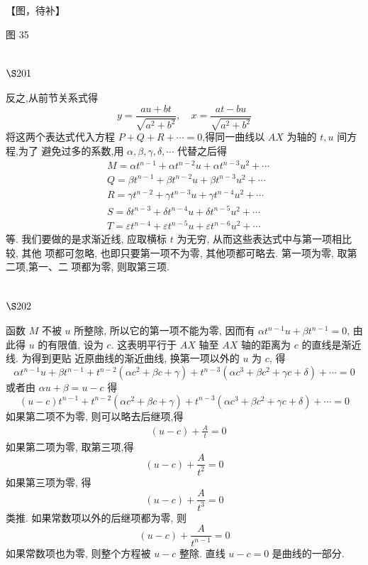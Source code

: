 【图，待补】

图 35

\section{$\S 201$}

反之,从前节关系式得
\[
y=\frac{a u+b t}{\sqrt{a^{2}+b^{2}}}, \quad x=\frac{a t-b u}{\sqrt{a^{2}+b^{2}}}
\]
将这两个表达式代入方程 $P+Q+R+\cdots=0$,得同一曲线以 $A X$ 为轴的 $t, u$ 间方程,为了 避免过多的系数,用 $\alpha, \beta, \gamma, \delta, \cdots$ 代替之后得
\[
\begin{aligned}
& M=\alpha t^{n-1}+\alpha t^{n-2} u+\alpha t^{n-3} u^{2}+\cdots \\
& Q=\beta t^{n-1}+\beta t^{n-2} u+\beta t^{n-3} u^{2}+\cdots \\
& R=\gamma t^{n-2}+\gamma t^{n-3} u+\gamma t^{n-4} u^{2}+\cdots \\
& S=\delta t^{n-3}+\delta t^{n-4} u+\delta t^{n-5} u^{2}+\cdots \\
& T=\varepsilon t^{n-4}+\varepsilon t^{n-5} u+\varepsilon t^{n-6} u^{2}+\cdots
\end{aligned}
\]
等. 我们要做的是求渐近线, 应取横标 $t$ 为无穷, 从而这些表达式中与第一项相比较, 其他 项都可忽略, 也即只要第一项不为零, 其他项都可略去. 第一项为零, 取第二项,第一、二 项都为零, 则取第三项.

\section{$\S 202$}

函数 $M$ 不被 $u$ 所整除, 所以它的第一项不能为零, 因而有 $\alpha t^{n-1} u+\beta t^{n-1}=0$, 由此得 $u$ 的有限值, 设为 $c$. 这表明平行于 $A X$ 轴至 $A X$ 轴的距离为 $c$ 的直线是渐近线. 为得到更贴 近原曲线的渐近曲线, 换第一项以外的 $u$ 为 $c$, 得
\[
\alpha t^{n-1} u+\beta t^{n-1}+t^{n-2}\left(\alpha c^{2}+\beta c+\gamma\right)+t^{n-3}\left(\alpha c^{3}+\beta c^{2}+\gamma c+\delta\right)+\cdots=0
\]
或者由 $\alpha u+\beta=u-c$ 得
\[
(u-c) t^{n-1}+t^{n-2}\left(\alpha c^{2}+\beta c+\gamma\right)+t^{n-3}\left(\alpha c^{3}+\beta c^{2}+\gamma c+\delta\right)+\cdots=0
\]
如果第二项不为零, 则可以略去后继项,得 
\[
\begin{aligned}
& (u-c)+\frac{A}{t}=0
\end{aligned}
\]
如果第二项为零, 取第三项,得
\[
(u-c)+\frac{A}{t^{2}}=0
\]
如果第三项为零, 得
\[
(u-c)+\frac{A}{t^{3}}=0
\]
类推. 如果常数项以外的后继项都为零, 则
\[
(u-c)+\frac{A}{t^{n-1}}=0
\]
如果常数项也为零, 则整个方程被 $u-c$ 整除. 直线 $u-c=0$ 是曲线的一部分.

